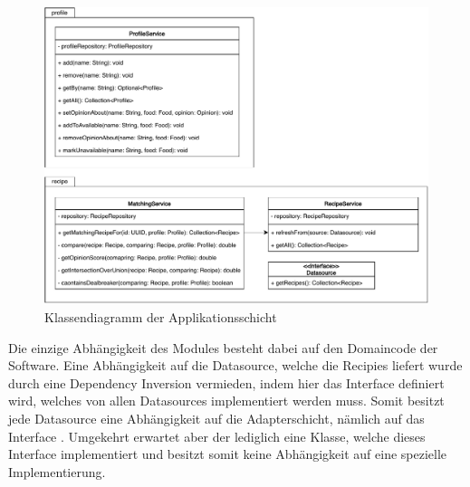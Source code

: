 \begin{figure}[ht!]
    \includegraphics[width=0.98\columnwidth]{../diagrams/application_uml.pdf}
    \caption{Klassendiagramm der Applikationsschicht}
    \label{fig:class-diag-application}
\end{figure}

Die einzige Abhängigkeit des Modules besteht dabei auf den Domaincode der Software. Eine Abhängigkeit auf die Datasource, welche die Recipies liefert wurde durch eine Dependency Inversion vermieden, indem hier das Interface \href{https://github.com/anditru/quickie/blob/bb41442c7f1ffbfcd3117cd86a40f7932e543a33/2-quickie-application/src/main/java/org/pinkcrazyunicorn/quickie/application/recipe/Datasource.java}{} definiert wird, welches von allen Datasources implementiert werden muss. Somit besitzt jede Datasource eine Abhängigkeit auf die Adapterschicht, nämlich auf das Interface \href{https://github.com/anditru/quickie/blob/bb41442c7f1ffbfcd3117cd86a40f7932e543a33/2-quickie-application/src/main/java/org/pinkcrazyunicorn/quickie/application/recipe/Datasource.java}{}. Umgekehrt erwartet aber der \href{https://github.com/anditru/quickie/blob/bb41442c7f1ffbfcd3117cd86a40f7932e543a33/2-quickie-application/src/main/java/org/pinkcrazyunicorn/quickie/application/recipe/RecipeService.java}{} lediglich eine Klasse, welche dieses Interface implementiert und besitzt somit keine Abhängigkeit auf eine spezielle Implementierung.

